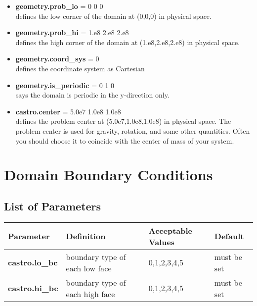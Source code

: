 \begin{itemize}

\item {\bf geometry.prob\_lo} = 0 0 0 \\
defines the low corner of the domain at (0,0,0) in physical space.  

\item {\bf geometry.prob\_hi} = 1.e8 2.e8 2.e8 \\
defines the high corner of the domain at (1.e8,2.e8,2.e8) in physical space.  

\item {\bf geometry.coord\_sys} = 0 \\
defines the coordinate system as Cartesian 

\item {\bf geometry.is\_periodic} = 0 1 0 \\
says the domain is periodic in the y-direction only. 

\item {\bf castro.center} = 5.0e7 1.0e8 1.0e8 \\
defines the problem center at (5.0e7,1.0e8,1.0e8) in physical space.
The problem center is used for gravity, rotation, and some other quantities.
Often you should choose it to coincide with the center of mass of your system.

\end{itemize}

\section{Domain Boundary Conditions}

\subsection{List of Parameters}

\begin{table*}[h]
\begin{scriptsize}
\begin{center}
\begin{tabular}{|l|l|l|l|} \hline
Parameter & Definition & Acceptable Values &Default\\
\hline
{\bf castro.lo\_bc} & boundary type of each low face  & 0,1,2,3,4,5 & must be set \\
{\bf castro.hi\_bc} & boundary type of each high face & 0,1,2,3,4,5 & must be set \\
\hline
\end{tabular}
\label{Table:BC}
\end{center}
\end{scriptsize}
\end{table*}

